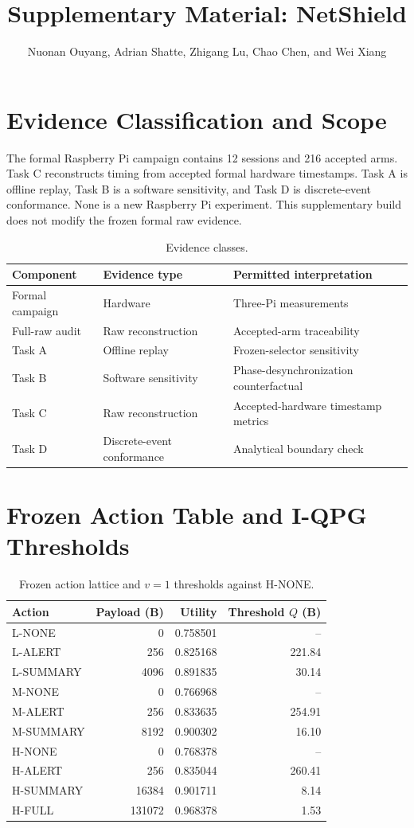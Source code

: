 \documentclass[10pt,onecolumn]{IEEEtran}
\begin{document}
\title{Supplementary Material: NetShield}
\author{Nuonan Ouyang, Adrian Shatte, Zhigang Lu, Chao Chen, and Wei Xiang}
\maketitle

\section{Evidence Classification and Scope}
The formal Raspberry Pi campaign contains 12 sessions and 216 accepted arms. Task C reconstructs timing from accepted formal hardware timestamps. Task A is offline replay, Task B is a software sensitivity, and Task D is discrete-event conformance. None is a new Raspberry Pi experiment. This supplementary build does not modify the frozen formal raw evidence.

\begin{table}[h]\centering\caption{Evidence classes.}\begin{tabular}{lll}\toprule
Component & Evidence type & Permitted interpretation\\\midrule
Formal campaign & Hardware & Three-Pi measurements\\
Full-raw audit & Raw reconstruction & Accepted-arm traceability\\
Task A & Offline replay & Frozen-selector sensitivity\\
Task B & Software sensitivity & Phase-desynchronization counterfactual\\
Task C & Raw reconstruction & Accepted-hardware timestamp metrics\\
Task D & Discrete-event conformance & Analytical boundary check\\\bottomrule
\end{tabular}\end{table}

\section{Frozen Action Table and I-QPG Thresholds}
\begin{table}[h]\centering\caption{Frozen action lattice and $v=1$ thresholds against H-NONE.}\begin{tabular}{lrrr}\toprule
Action & Payload (B) & Utility & Threshold $Q$ (B)\\\midrule
L-NONE&0&0.758501&--\\ L-ALERT&256&0.825168&221.84\\ L-SUMMARY&4096&0.891835&30.14\\
M-NONE&0&0.766968&--\\ M-ALERT&256&0.833635&254.91\\ M-SUMMARY&8192&0.900302&16.10\\
H-NONE&0&0.768378&--\\ H-ALERT&256&0.835044&260.41\\ H-SUMMARY&16384&0.901711&8.14\\ H-FULL&131072&0.968378&1.53\\\bottomrule
\end{tabular}\end{table}
\end{document}

